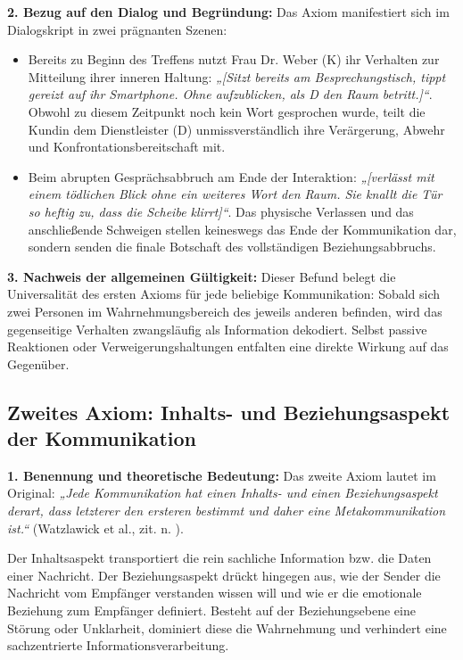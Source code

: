 \textbf{2. Bezug auf den Dialog und Begründung:}
Das Axiom manifestiert sich im Dialogskript in zwei prägnanten Szenen:
\begin{itemize}
    \item Bereits zu Beginn des Treffens nutzt Frau Dr. Weber (K) ihr Verhalten zur Mitteilung ihrer inneren Haltung: \textit{„[Sitzt bereits am Besprechungstisch, tippt gereizt auf ihr Smartphone. Ohne aufzublicken, als D den Raum betritt.]“}. Obwohl zu diesem Zeitpunkt noch kein Wort gesprochen wurde, teilt die Kundin dem Dienstleister (D) unmissverständlich ihre Verärgerung, Abwehr und Konfrontationsbereitschaft mit.
    \item Beim abrupten Gesprächsabbruch am Ende der Interaktion: \textit{„[verlässt mit einem tödlichen Blick ohne ein weiteres Wort den Raum. Sie knallt die Tür so heftig zu, dass die Scheibe klirrt]“}. Das physische Verlassen und das anschließende Schweigen stellen keineswegs das Ende der Kommunikation dar, sondern senden die finale Botschaft des vollständigen Beziehungsabbruchs.
\end{itemize}

\textbf{3. Nachweis der allgemeinen Gültigkeit:}
Dieser Befund belegt die Universalität des ersten Axioms für jede beliebige Kommunikation: Sobald sich zwei Personen im Wahrnehmungsbereich des jeweils anderen befinden, wird das gegenseitige Verhalten zwangsläufig als Information dekodiert. Selbst passive Reaktionen oder Verweigerungshaltungen entfalten eine direkte Wirkung auf das Gegenüber.

\subsection{Zweites Axiom: Inhalts- und Beziehungsaspekt der Kommunikation}

\textbf{1. Benennung und theoretische Bedeutung:}
Das zweite Axiom lautet im Original: \textit{„Jede Kommunikation hat einen Inhalts- und einen Beziehungsaspekt derart, dass letzterer den ersteren bestimmt und daher eine Metakommunikation ist.“} (Watzlawick et al., zit. n. \cite[S.~12--13]{3}).

Der Inhaltsaspekt transportiert die rein sachliche Information bzw. die Daten einer Nachricht. Der Beziehungsaspekt drückt hingegen aus, wie der Sender die Nachricht vom Empfänger verstanden wissen will und wie er die emotionale Beziehung zum Empfänger definiert. Besteht auf der Beziehungsebene eine Störung oder Unklarheit, dominiert diese die Wahrnehmung und verhindert eine sachzentrierte Informationsverarbeitung.

